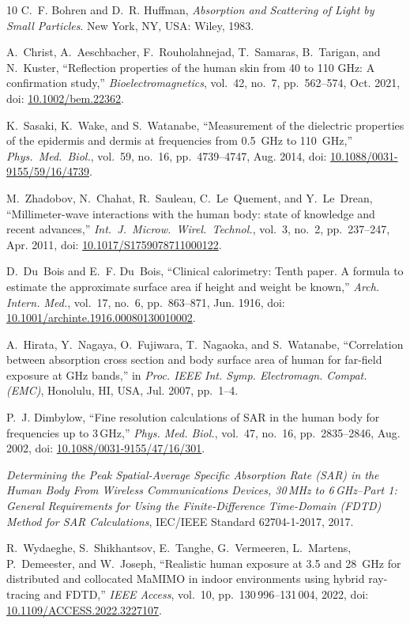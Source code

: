 \documentclass[journal,twocolumn,10pt]{IEEEtran}
\newcommand*{\doi}[1]{\href{https://doi.org/#1}{#1}}
\theoremstyle{plain}
\begin{document}
\begin{thebibliography}{10}
C.~F. Bohren and D.~R. Huffman, \emph{Absorption and Scattering of
  Light by Small Particles}.
  New York, NY, USA: Wiley, 1983.

A.~Christ, A.~Aeschbacher, F.~Rouholahnejad, T.~Samaras, B.~Tarigan,
  and N.~Kuster, ``Reflection properties of the human skin from 40 to
  110 GHz: A confirmation study,'' \emph{Bioelectromagnetics},
  vol.~42, no.~7, pp.~562--574, Oct. 2021,
  doi: \doi{10.1002/bem.22362}.

K.~Sasaki, K.~Wake, and S.~Watanabe, ``Measurement of the dielectric
  properties of the epidermis and dermis at frequencies from 0.5~GHz
  to 110~GHz,'' \emph{Phys.\ Med.\ Biol.}, vol.~59, no.~16,
  pp.~4739--4747, Aug. 2014,
  doi: \doi{10.1088/0031-9155/59/16/4739}.

M.~Zhadobov, N.~Chahat, R.~Sauleau, C.~Le~Quement, and Y.~Le~Drean,
  ``Millimeter-wave interactions with the human body: state of
  knowledge and recent advances,'' \emph{Int.\ J.\ Microw.\ Wirel.\
  Technol.}, vol.~3, no.~2, pp.~237--247, Apr. 2011,
  doi: \doi{10.1017/S1759078711000122}.

D.~Du~Bois and E.~F. Du~Bois, ``Clinical calorimetry: Tenth paper.
  A formula to estimate the approximate surface area if height and
  weight be known,'' \emph{Arch. Intern. Med.}, vol.~17, no.~6,
  pp.~863--871, Jun. 1916,
  doi: \doi{10.1001/archinte.1916.00080130010002}.

A.~Hirata, Y.~Nagaya, O.~Fujiwara, T.~Nagaoka, and S.~Watanabe,
  ``Correlation between absorption cross section and body surface area
  of human for far-field exposure at GHz bands,'' in \emph{Proc. IEEE
  Int. Symp. Electromagn. Compat. (EMC)}, Honolulu, HI, USA, Jul. 2007,
  pp.~1--4.

P.~J. Dimbylow, ``Fine resolution calculations of SAR in the human body
  for frequencies up to 3\,GHz,'' \emph{Phys. Med. Biol.}, vol.~47,
  no.~16, pp.~2835--2846, Aug. 2002,
  doi: \doi{10.1088/0031-9155/47/16/301}.

\emph{Determining the Peak Spatial-Average Specific Absorption Rate
  (SAR) in the Human Body From Wireless Communications Devices, 30\,MHz
  to 6\,GHz--Part 1: General Requirements for Using the
  Finite-Difference Time-Domain (FDTD) Method for SAR Calculations},
  IEC/IEEE Standard 62704-1-2017, 2017.

R.~Wydaeghe, S.~Shikhantsov, E.~Tanghe, G.~Vermeeren, L.~Martens,
  P.~Demeester, and W.~Joseph, ``Realistic human exposure at
  3.5 and 28~GHz for distributed and collocated MaMIMO in indoor
  environments using hybrid ray-tracing and FDTD,'' \emph{IEEE
  Access}, vol.~10, pp.~130\,996--131\,004, 2022, doi:
  \doi{10.1109/ACCESS.2022.3227107}.


\end{thebibliography}
\end{document}
